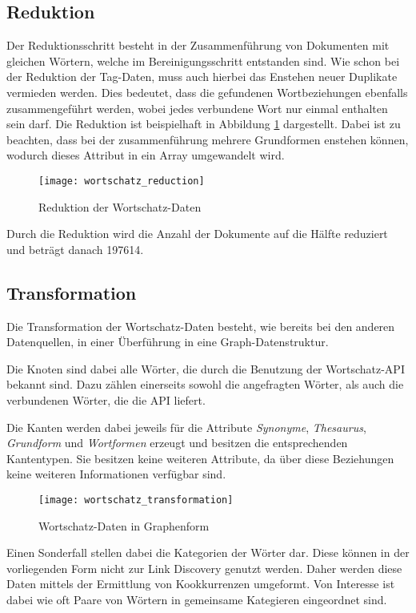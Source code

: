 \subsection{Reduktion}

Der Reduktionsschritt besteht in der Zusammenführung von Dokumenten mit gleichen Wörtern, welche im Bereinigungsschritt entstanden sind. Wie schon bei der Reduktion der Tag-Daten, muss auch hierbei das Enstehen neuer Duplikate vermieden werden. Dies bedeutet, dass die gefundenen Wortbeziehungen ebenfalls zusammengeführt werden, wobei jedes verbundene Wort nur einmal enthalten sein darf. Die Reduktion ist beispielhaft in Abbildung \ref{fig:wortschatz_reduction} dargestellt. Dabei ist zu beachten, dass bei der zusammenführung mehrere Grundformen enstehen können, wodurch dieses Attribut in ein Array umgewandelt wird.

\begin{figure}
\centering
\texttt{[image: wortschatz\_reduction]}
\caption{Reduktion der Wortschatz-Daten}
\label{fig:wortschatz_reduction}
\end{figure}

Durch die Reduktion wird die Anzahl der Dokumente auf die Hälfte reduziert und beträgt danach \num{197614}.

\subsection{Transformation}

Die Transformation der Wortschatz-Daten besteht, wie bereits bei den anderen Datenquellen, in einer Überführung in eine Graph-Datenstruktur. 

Die Knoten sind dabei alle Wörter, die durch die Benutzung der Wortschatz-API bekannt sind. Dazu zählen einerseits sowohl die angefragten Wörter, als auch die verbundenen Wörter, die die API liefert.

Die Kanten werden dabei jeweils für die Attribute \emph{Synonyme}, \emph{Thesaurus}, \emph{Grundform} und \emph{Wortformen} erzeugt und besitzen die entsprechenden Kantentypen. Sie besitzen keine weiteren Attribute, da über diese Beziehungen keine weiteren Informationen verfügbar sind.
\begin{figure}
\centering
\texttt{[image: wortschatz\_transformation]}
\caption{Wortschatz-Daten in Graphenform}
\label{fig:wortschatz_transformation}
\end{figure}

Einen Sonderfall stellen dabei die Kategorien der Wörter dar. Diese können in der vorliegenden Form nicht zur Link Discovery genutzt werden. Daher werden diese Daten mittels der Ermittlung von Kookkurrenzen umgeformt. Von Interesse ist dabei wie oft Paare von Wörtern 
in gemeinsame Kategieren eingeordnet sind. 

